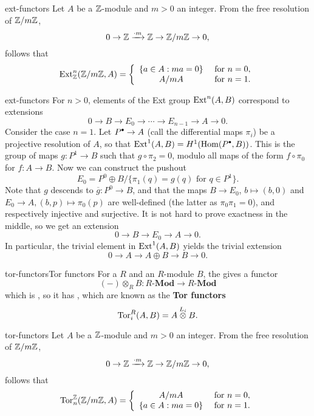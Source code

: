 \begin{example}{ext-functors}
    Let $A$ be a $\mathbb{Z}$-module and $m > 0$ an integer. From the free resolution of $\mathbb{Z}/m\mathbb{Z}$,
    \[ 0 \to \mathbb{Z} \xrightarrow{\cdot m} \mathbb{Z} \to \mathbb{Z} / m \mathbb{Z} \to 0 , \]
    follows that
    \[ \textup{Ext}^n_{\mathbb{Z}}(\mathbb{Z}/m\mathbb{Z}, A) = \left\{ \begin{array}{cl} \{ a \in A : ma = 0 \} & \textup{ for } n = 0 , \\ A/mA & \textup{ for } n = 1 . \end{array} \right. \]
\end{example}

\begin{example}{ext-functors}
    For $n > 0$, elements of the Ext group $\textup{Ext}^n(A, B)$ correspond to extensions
    \[ 0 \to B \to E_0 \to \cdots \to E_{n - 1} \to A \to 0 . \]
    Consider the case $n = 1$. Let $P^\bdot \to A$ (call the differential maps $\pi_i$) be a projective resolution of $A$, so that $\textup{Ext}^1(A, B) = H^1(\Hom(P^\bdot, B))$. This is the group of maps $g : P^1 \to B$ such that $g \circ \pi_2 = 0$, modulo all maps of the form $f \circ \pi_0$ for $f : A \to B$. Now we can construct the pushout
    \[ E_0 = P^0 \oplus B / \{ \pi_1(q) = g(q) \text{ for } q \in P^1 \} . \]
    Note that $g$ descends to $\overline{g} : P^0 \to B$, and that the maps $B \to E_0$, $b \mapsto (b, 0)$ and $E_0 \to A, (b, p) \mapsto \pi_0(p)$ are well-defined (the latter as $\pi_0 \pi_1 = 0$), and respectively injective and surjective. It is not hard to prove exactness in the middle, so we get an extension
    \[ 0 \to B \to E_0 \to A \to 0 . \]
    In particular, the trivial element in $\textup{Ext}^1(A, B)$ yields the trivial extension
    \[ 0 \to A \to A \oplus B \to B \to 0 . \]
\end{example}

\begin{topic}{tor-functors}{Tor functors}
    For a  $R$ and an $R$-module $B$, the  gives a functor
    \[ (-) \otimes_R B : R\textbf{-Mod} \to R\textbf{-Mod} \]
    which is , so it has , which are known as the \textbf{Tor functors}
    \[ \textup{Tor}^R_i(A, B) = A \overset{L_i}{\otimes} B . \]
\end{topic}

\begin{example}{tor-functors}
    Let $A$ be a $\mathbb{Z}$-module and $m > 0$ an integer. From the free resolution of $\mathbb{Z}/m\mathbb{Z}$,
    \[ 0 \to \mathbb{Z} \xrightarrow{\cdot m} \mathbb{Z} \to \mathbb{Z} / m \mathbb{Z} \to 0 , \]
    follows that
    \[ \textup{Tor}_n^{\mathbb{Z}}(\mathbb{Z}/m\mathbb{Z}, A) = \left\{ \begin{array}{cl} A/mA & \textup{ for } n = 0 , \\ \{ a \in A : ma = 0 \} & \textup{ for } n = 1 . \end{array} \right. \]
\end{example}

